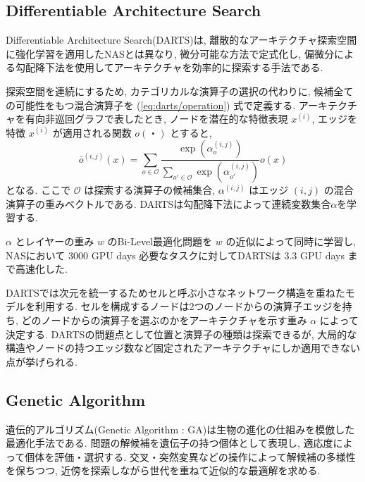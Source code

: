 \documentclass[twocolumn]{jarticle}     %
\begin{document}
\subsection{Differentiable Architecture Search}
Differentiable Architecture Search(DARTS)\cite{DBLP:journals/corr/abs-1806-09055}は,
離散的なアーキテクチャ探索空間に強化学習を適用したNASとは異なり,
微分可能な方法で定式化し,
偏微分による勾配降下法を使用してアーキテクチャを効率的に探索する手法である.

探索空間を連続にするため, カテゴリカルな演算子の選択の代わりに, 候補全ての可能性をもつ混合演算子を
(\ref{eq:darts/operation}) 式で定義する.
アーキテクチャを有向非巡回グラフで表したとき, ノードを潜在的な特徴表現 $x^{(i)}$,
エッジを特徴 $x^{(i)}$ が適用される関数 $o(・)$ とすると,
\begin{equation}
  \label{eq:darts/operation}
  \bar{o}^{(i, j)}(x) = \sum_{o \in \mathcal{O}} \frac{\exp(\alpha^{(i, j)}_o)}{\sum_{o' \in \mathcal{O}} \exp(\alpha^{(i, j)}_{o'})} o(x)
\end{equation}
となる. ここで
$\mathcal{O}$ は探索する演算子の候補集合,
$\alpha^{(i, j)}$ はエッジ $(i, j)$ の混合演算子の重みベクトルである.
DARTSは勾配降下法によって連続変数集合$\alpha$を学習する.

$\alpha$ とレイヤーの重み $w$ のBi-Level最適化問題を $w$ の近似によって同時に学習し,
NASにおいて 3000 GPU days 必要なタスクに対してDARTSは 3.3 GPU days まで高速化した.

DARTSでは次元を統一するためセルと呼ぶ小さなネットワーク構造を重ねたモデルを利用する.
セルを構成するノードは2つのノードからの演算子エッジを持ち,
どのノードからの演算子を選ぶのかをアーキテクチャを示す重み $\alpha$ によって決定する.
DARTSの問題点として位置と演算子の種類は探索できるが,
大局的な構造やノードの持つエッジ数など固定されたアーキテクチャにしか適用できない点が挙げられる.


\subsection{Genetic Algorithm}
遺伝的アルゴリズム(Genetic Algorithm : GA)は生物の進化の仕組みを模倣した最適化手法である.
問題の解候補を遺伝子の持つ個体として表現し, 適応度によって個体を評価・選択する.
交叉・突然変異などの操作によって解候補の多様性を保ちつつ,
近傍を探索しながら世代を重ねて近似的な最適解を求める.

\end{document}
